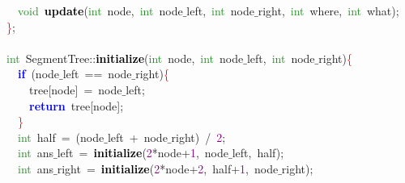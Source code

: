 \mbox{}\ \ \textcolor{ForestGreen}{void}\ \textbf{\textcolor{Black}{update}}\textcolor{BrickRed}{(}\textcolor{ForestGreen}{int}\ node\textcolor{BrickRed}{,}\ \textcolor{ForestGreen}{int}\ node$\_$left\textcolor{BrickRed}{,}\ \textcolor{ForestGreen}{int}\ node$\_$right\textcolor{BrickRed}{,}\ \textcolor{ForestGreen}{int}\ where\textcolor{BrickRed}{,}\ \textcolor{ForestGreen}{int}\ what\textcolor{BrickRed}{);} \\
\mbox{}\textcolor{Red}{\}}\textcolor{BrickRed}{;} \\
\mbox{} \\
\mbox{}\textcolor{ForestGreen}{int}\ SegmentTree\textcolor{BrickRed}{::}\textbf{\textcolor{Black}{initialize}}\textcolor{BrickRed}{(}\textcolor{ForestGreen}{int}\ node\textcolor{BrickRed}{,}\ \textcolor{ForestGreen}{int}\ node$\_$left\textcolor{BrickRed}{,}\ \textcolor{ForestGreen}{int}\ node$\_$right\textcolor{BrickRed}{)}\textcolor{Red}{\{} \\
\mbox{}\ \ \textbf{\textcolor{Blue}{if}}\ \textcolor{BrickRed}{(}node$\_$left\ \textcolor{BrickRed}{==}\ node$\_$right\textcolor{BrickRed}{)}\textcolor{Red}{\{} \\
\mbox{}\ \ \ \ tree\textcolor{BrickRed}{[}node\textcolor{BrickRed}{]}\ \textcolor{BrickRed}{=}\ node$\_$left\textcolor{BrickRed}{;} \\
\mbox{}\ \ \ \ \textbf{\textcolor{Blue}{return}}\ tree\textcolor{BrickRed}{[}node\textcolor{BrickRed}{];} \\
\mbox{}\ \ \textcolor{Red}{\}} \\
\mbox{}\ \ \textcolor{ForestGreen}{int}\ half\ \textcolor{BrickRed}{=}\ \textcolor{BrickRed}{(}node$\_$left\ \textcolor{BrickRed}{+}\ node$\_$right\textcolor{BrickRed}{)}\ \textcolor{BrickRed}{/}\ \textcolor{Purple}{2}\textcolor{BrickRed}{;} \\
\mbox{}\ \ \textcolor{ForestGreen}{int}\ ans$\_$left\ \textcolor{BrickRed}{=}\ \textbf{\textcolor{Black}{initialize}}\textcolor{BrickRed}{(}\textcolor{Purple}{2}\textcolor{BrickRed}{*}node\textcolor{BrickRed}{+}\textcolor{Purple}{1}\textcolor{BrickRed}{,}\ node$\_$left\textcolor{BrickRed}{,}\ half\textcolor{BrickRed}{);} \\
\mbox{}\ \ \textcolor{ForestGreen}{int}\ ans$\_$right\ \textcolor{BrickRed}{=}\ \textbf{\textcolor{Black}{initialize}}\textcolor{BrickRed}{(}\textcolor{Purple}{2}\textcolor{BrickRed}{*}node\textcolor{BrickRed}{+}\textcolor{Purple}{2}\textcolor{BrickRed}{,}\ half\textcolor{BrickRed}{+}\textcolor{Purple}{1}\textcolor{BrickRed}{,}\ node$\_$right\textcolor{BrickRed}{);} \\
